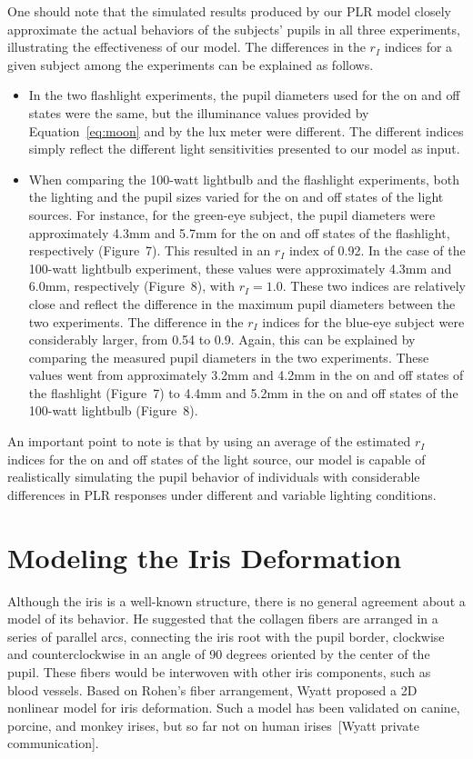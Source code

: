 \documentclass{acmtog}
\begin{document}
One should note that the simulated results produced by our PLR model closely approximate the actual behaviors of the subjects' pupils in all three experiments, illustrating the effectiveness of our model. The differences in the $r_I$ indices for a given subject among the experiments can be explained as
follows.
\begin{itemize}
\item In the two flashlight experiments, the pupil diameters used for the {on} and {off} states were the same, but the illuminance values provided by Equation~\ref{eq:moon} and by the lux meter were different. The different indices simply reflect the different light sensitivities presented to our model as
input.
\item When comparing the 100-watt lightbulb and the flashlight experiments, both the lighting and the pupil sizes varied
for the {on} and {off} states of the light sources. For instance, for the green-eye subject, the pupil diameters
were approximately 4.3mm and 5.7mm for the {on} and {off} states of the flashlight, respectively
(Figure~7). This resulted in an $r_I$ index of 0.92. In the case of the
100-watt lightbulb experiment, these values were approximately 4.3mm and 6.0mm, respectively
(Figure~8), with $r_I = 1.0$. These two indices are relatively close and reflect the
difference in the maximum pupil diameters between the two experiments.
The difference in the $r_I$ indices for the blue-eye subject were considerably larger, from 0.54 to 0.9. Again, this can be
explained by comparing the measured pupil diameters in the two experiments. These values went from approximately 3.2mm
and 4.2mm in the {on} and {off} states of the flashlight (Figure~7)
to 4.4mm and 5.2mm in the {on} and {off} states of the 100-watt lightbulb
(Figure~8). 
\end{itemize}
An important point to note is that by using an average of the estimated $r_I$ indices for the {on} and {off}
states of the light source, our model is capable of realistically simulating the pupil behavior of individuals with
considerable differences in PLR responses under different and variable lighting conditions.


\section{Modeling the Iris Deformation}
\label{sec:patterndeformations}

Although the iris is a well-known structure, there is no general agreement about a model of its behavior.
 He suggested that the collagen fibers are arranged in a series of parallel arcs, connecting the iris root with the pupil
border, clockwise and counterclockwise in an angle of 90 degrees oriented by the center of the pupil. These fibers would
be interwoven with other iris components, such as blood vessels. Based on  Rohen's fiber arrangement,
Wyatt proposed a 2D nonlinear model for iris deformation. Such a model has been validated on
canine, porcine, and monkey irises, but so far not on human irises~[Wyatt private communication]. 
\end{document}
